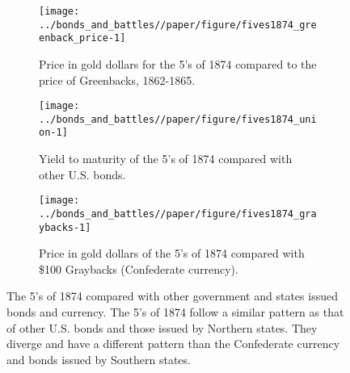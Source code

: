 \begin{figure}[!]
  \begin{subfigure}[b]{0.45\linewidth}
    \texttt{[image: ../bonds\_and\_battles//paper/figure/fives1874\_greenback\_price-1]}
  \caption{Price in gold dollars for the 5's of 1874 compared to the price of Greenbacks, 1862-1865.}
  \label{bonds:fig:fives1874_greenbacks}
\end{subfigure}%
\hspace{0.1\linewidth}%
\begin{subfigure}[b]{0.45\linewidth}
    \texttt{[image: ../bonds\_and\_battles//paper/figure/fives1874\_union-1]}
    \caption{Yield to maturity of the 5's of 1874 compared with other U.S. bonds.}
  \label{bonds:fig:fives1874_union}
\end{subfigure}


\begin{subfigure}[b]{0.45\linewidth}
  \texttt{[image: ../bonds\_and\_battles//paper/figure/fives1874\_graybacks-1]}
\caption{Price in gold dollars of the 5's of 1874 compared with \$100 Graybacks (Confederate currency).}
\label{bonds:fig:fives1874_grayback}
\end{subfigure}
\caption[The 5's of 1874 compared with other government and states issued bonds and currency.]{The 5's of 1874 compared with other government and states issued bonds and currency.
  The 5's of 1874 follow a similar pattern as that of other U.S. bonds and those issued by Northern states.
  They diverge and have a different pattern than the Confederate currency and bonds issued by Southern states.
}
\label{bonds:fig:fives1874_compared}
\end{figure}



